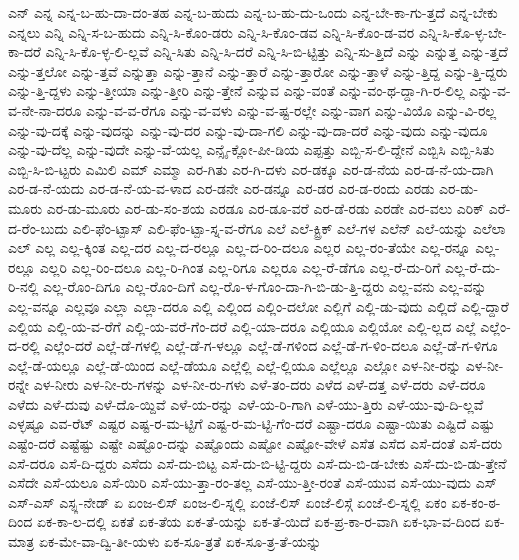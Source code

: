 {ಎನ್
ಎನ್ನ
ಎನ್ನ-ಬ-ಹು-ದಾ-ದಂ-ತಹ
ಎನ್ನ-ಬ-ಹುದು
ಎನ್ನ-ಬ-ಹು-ದು-ಒಂದು
ಎನ್ನ-ಬೇ-ಕಾ-ಗು-ತ್ತದೆ
ಎನ್ನ-ಬೇಕು
ಎನ್ನಲು
ಎನ್ನಿ
ಎನ್ನಿ-ಸ-ಬ-ಹುದು
ಎನ್ನಿ-ಸಿ-ಕೊಂ-ಡರು
ಎನ್ನಿ-ಸಿ-ಕೊಂ-ಡವ
ಎನ್ನಿ-ಸಿ-ಕೊಂ-ಡ-ವರ
ಎನ್ನಿ-ಸಿ-ಕೊ-ಳ್ಳ-ಬೇ-ಕಾ-ದರೆ
ಎನ್ನಿ-ಸಿ-ಕೊ-ಳ್ಳ-ಲಿ-ಲ್ಲವೆ
ಎನ್ನಿ-ಸಿತು
ಎನ್ನಿ-ಸಿ-ದರೆ
ಎನ್ನಿ-ಸಿ-ಬಿ-ಟ್ಟಿತ್ತು
ಎನ್ನಿ-ಸು-ತ್ತಿದೆ
ಎನ್ನು
ಎನ್ನುತ್ತ
ಎನ್ನು-ತ್ತದೆ
ಎನ್ನು-ತ್ತಲೋ
ಎನ್ನು-ತ್ತವೆ
ಎನ್ನುತ್ತಾ
ಎನ್ನು-ತ್ತಾನೆ
ಎನ್ನು-ತ್ತಾರೆ
ಎನ್ನು-ತ್ತಾರೋ
ಎನ್ನು-ತ್ತಾಳೆ
ಎನ್ನು-ತ್ತಿದ್ದ
ಎನ್ನು-ತ್ತಿ-ದ್ದರು
ಎನ್ನು-ತ್ತಿ-ದ್ದಳು
ಎನ್ನು-ತ್ತೀಯಾ
ಎನ್ನು-ತ್ತೀರಿ
ಎನ್ನು-ತ್ತೇನೆ
ಎನ್ನುವ
ಎನ್ನು-ವಂತೆ
ಎನ್ನು-ವಂ-ಥ-ದ್ದಾ-ಗಿ-ರ-ಲಿಲ್ಲ
ಎನ್ನು-ವ-ವ-ನೇ-ನಾ-ದರೂ
ಎನ್ನು-ವ-ವ-ರೆಗೂ
ಎನ್ನು-ವ-ವಳು
ಎನ್ನು-ವ-ಷ್ಟ-ರಲ್ಲೇ
ಎನ್ನು-ವಾಗ
ಎನ್ನು-ವಿಯೊ
ಎನ್ನು-ವಿ-ರಲ್ಲ
ಎನ್ನು-ವು-ದಕ್ಕೆ
ಎನ್ನು-ವುದನ್ನು
ಎನ್ನು-ವು-ದರ
ಎನ್ನು-ವು-ದಾ-ಗಲಿ
ಎನ್ನು-ವು-ದಾ-ದರೆ
ಎನ್ನು-ವುದು
ಎನ್ನು-ವುದೂ
ಎನ್ನು-ವು-ದೆಲ್ಲ
ಎನ್ನು-ವುದೇ
ಎನ್ನು-ವೆ-ಯಲ್ಲ
ಎನ್ಸೈ-ಕ್ಲೋ-ಪೀ-ಡಿಯ
ಎಪ್ಪತ್ತು
ಎಬ್ಬಿ-ಸ-ಲಿ-ದ್ದೇನೆ
ಎಬ್ಬಿಸಿ
ಎಬ್ಬಿ-ಸಿತು
ಎಬ್ಬಿ-ಸಿ-ಬಿ-ಟ್ಟರು
ಎಮಿಲಿ
ಎಮ್
ಎಮ್ಮಾ
ಎರ-ಗಿತು
ಎರ-ಗಿ-ದಳು
ಎರ-ಡಕ್ಕೂ
ಎರ-ಡ-ನೆಯ
ಎರ-ಡ-ನೆ-ಯ-ದಾಗಿ
ಎರ-ಡ-ನೆ-ಯದು
ಎರ-ಡ-ನೆ-ಯ-ವ-ಳಾದ
ಎರ-ಡನೇ
ಎರ-ಡನ್ನೂ
ಎರ-ಡರ
ಎರ-ಡ-ರಂದು
ಎರಡು
ಎರ-ಡು-ಮೂರು
ಎರ-ಡು-ಮೂರು
ಎರ-ಡು-ಸಂ-ಶಯ
ಎರಡೂ
ಎರ-ಡೂ-ವರೆ
ಎರ-ಡೆ-ರಡು
ಎರಡೇ
ಎರ-ವಲು
ಎರಿಕ್
ಎರೆ-ದ-ರೆಂ-ಬುದು
ಎಲಿ-ಫೆಂ-ಟ್ಪಾಸ್
ಎಲಿ-ಫೆಂ-ಟ್ಪಾ-ಸ್ನ-ವ-ರೆಗೂ
ಎಲೆ
ಎಲೆ-ಕ್ಟ್ರಿಕ್
ಎಲೆ-ಗಳ
ಎಲೆನ್
ಎಲೆ-ಯನ್ನು
ಎಲೆಲಾ
ಎಲ್
ಎಲ್ಲ
ಎಲ್ಲ-ಕ್ಕಿಂತ
ಎಲ್ಲ-ದರ
ಎಲ್ಲ-ದ-ರಲ್ಲೂ
ಎಲ್ಲ-ದ-ರಿಂ-ದಲೂ
ಎಲ್ಲರ
ಎಲ್ಲ-ರಂ-ತೆಯೇ
ಎಲ್ಲ-ರನ್ನೂ
ಎಲ್ಲ-ರಲ್ಲೂ
ಎಲ್ಲರಿ
ಎಲ್ಲ-ರಿಂ-ದಲೂ
ಎಲ್ಲ-ರಿ-ಗಿಂತ
ಎಲ್ಲ-ರಿಗೂ
ಎಲ್ಲರೂ
ಎಲ್ಲ-ರೆ-ಡೆಗೂ
ಎಲ್ಲ-ರೆ-ದು-ರಿಗೆ
ಎಲ್ಲ-ರೆ-ದು-ರಿ-ನಲ್ಲಿ
ಎಲ್ಲ-ರೊಂ-ದಿಗೂ
ಎಲ್ಲ-ರೊಂ-ದಿಗೆ
ಎಲ್ಲ-ರೊ-ಳ-ಗೊಂ-ದಾ-ಗಿ-ಬಿ-ಡು-ತ್ತಿ-ದ್ದರು
ಎಲ್ಲ-ವನು
ಎಲ್ಲ-ವನ್ನು
ಎಲ್ಲ-ವನ್ನೂ
ಎಲ್ಲವೂ
ಎಲ್ಲಾ
ಎಲ್ಲಾ-ದರೂ
ಎಲ್ಲಿ
ಎಲ್ಲಿಂದ
ಎಲ್ಲಿಂ-ದಲೋ
ಎಲ್ಲಿಗೆ
ಎಲ್ಲಿ-ಡು-ವುದು
ಎಲ್ಲಿದೆ
ಎಲ್ಲಿ-ದ್ದಾರೆ
ಎಲ್ಲಿಯ
ಎಲ್ಲಿ-ಯ-ವ-ರೆಗೆ
ಎಲ್ಲಿ-ಯ-ವರೆ-ಗೆಂ-ದರೆ
ಎಲ್ಲಿ-ಯಾ-ದರೂ
ಎಲ್ಲಿಯೂ
ಎಲ್ಲಿಯೋ
ಎಲ್ಲಿ-ಲ್ಲದ
ಎಲ್ಲೆ
ಎಲ್ಲೆಂ-ದ-ರಲ್ಲಿ
ಎಲ್ಲೆಂ-ದರೆ
ಎಲ್ಲೆ-ಡೆ-ಗಳಲ್ಲಿ
ಎಲ್ಲೆ-ಡೆ-ಗ-ಳಲ್ಲೂ
ಎಲ್ಲೆ-ಡೆ-ಗಳಿಂದ
ಎಲ್ಲೆ-ಡೆ-ಗ-ಳಿಂ-ದಲೂ
ಎಲ್ಲೆ-ಡೆ-ಗ-ಳಿಗೂ
ಎಲ್ಲೆ-ಡೆ-ಯಲ್ಲೂ
ಎಲ್ಲೆ-ಡೆ-ಯಿಂದ
ಎಲ್ಲೆ-ಡೆಯೂ
ಎಲ್ಲೆಲ್ಲಿ
ಎಲ್ಲೆ-ಲ್ಲಿಯೂ
ಎಲ್ಲೆಲ್ಲೂ
ಎಲ್ಲೋ
ಎಳ-ನೀ-ರನ್ನು
ಎಳ-ನೀ-ರನ್ನೇ
ಎಳ-ನೀರು
ಎಳ-ನೀ-ರು-ಗಳನ್ನು
ಎಳ-ನೀ-ರು-ಗಳು
ಎಳೆ-ತಂ-ದರು
ಎಳೆದ
ಎಳೆ-ದತ್ತ
ಎಳೆ-ದರು
ಎಳೆ-ದರೂ
ಎಳೆದು
ಎಳೆ-ದುವು
ಎಳೆ-ದೊ-ಯ್ದಿವೆ
ಎಳೆ-ಯ-ರನ್ನು
ಎಳೆ-ಯ-ರಿ-ಗಾಗಿ
ಎಳೆ-ಯು-ತ್ತಿರು
ಎಳೆ-ಯು-ವು-ದಿ-ಲ್ಲವೆ
ಎಳ್ಳಷ್ಟೂ
ಎವ-ರೆಟ್
ಎಷ್ಟರ
ಎಷ್ಟ-ರ-ಮ-ಟ್ಟಿಗೆ
ಎಷ್ಟ-ರ-ಮ-ಟ್ಟಿ-ಗೆಂ-ದರೆ
ಎಷ್ಟಾ-ದರೂ
ಎಷ್ಟಾ-ಯಿತು
ಎಷ್ಟಿದೆ
ಎಷ್ಟು
ಎಷ್ಟೆಂ-ದರೆ
ಎಷ್ಟೆಷ್ಟು
ಎಷ್ಟೇ
ಎಷ್ಟೊಂ-ದನ್ನು
ಎಷ್ಟೊಂದು
ಎಷ್ಟೋ
ಎಷ್ಟೋ-ವೇಳೆ
ಎಸೆತ
ಎಸೆದ
ಎಸೆ-ದಂತೆ
ಎಸೆ-ದರು
ಎಸೆ-ದರೂ
ಎಸೆ-ದಿ-ದ್ದರು
ಎಸೆದು
ಎಸೆ-ದು-ಬಿಟ್ಟ
ಎಸೆ-ದು-ಬಿ-ಟ್ಟಿ-ದ್ದರು
ಎಸೆ-ದು-ಬಿ-ಡ-ಬೇಕು
ಎಸೆ-ದು-ಬಿ-ಡು-ತ್ತೇನೆ
ಎಸೆದೇ
ಎಸೆ-ಯಲೂ
ಎಸೆ-ಯಿರಿ
ಎಸೆ-ಯು-ತ್ತಾ-ರಂ-ತಲ್ಲ
ಎಸೆ-ಯು-ತ್ತೀ-ರಂತೆ
ಎಸೆ-ಯುವ
ಎಸೆ-ಯು-ವುದು
ಎಸ್
ಎಸ್-ಎಸ್
ಎಸ್ಪ್ಲ-ನೇಡ್
ಏ
ಏಂಜ-ಲಿಸ್
ಏಂಜ-ಲಿ-ಸ್ನಲ್ಲಿ
ಏಂಜೆ-ಲಿಸ್
ಏಂಜೆ-ಲಿಸ್ಗೆ
ಏಂಜೆ-ಲಿ-ಸ್ನಲ್ಲಿ
ಏಕಂ
ಏಕ-ಕಂ-ಠ-ದಿಂದ
ಏಕ-ಕಾ-ಲ-ದಲ್ಲಿ
ಏಕತೆ
ಏಕ-ತೆಯ
ಏಕ-ತೆ-ಯನ್ನು
ಏಕ-ತೆ-ಯಿದೆ
ಏಕ-ಪ್ರ-ಕಾ-ರ-ವಾಗಿ
ಏಕ-ಭಾ-ವ-ದಿಂದ
ಏಕ-ಮಾತ್ರ
ಏಕ-ಮೇ-ವಾ-ದ್ವಿ-ತೀ-ಯಳು
ಏಕ-ಸೂ-ತ್ರತೆ
ಏಕ-ಸೂ-ತ್ರ-ತೆ-ಯನ್ನು
}
